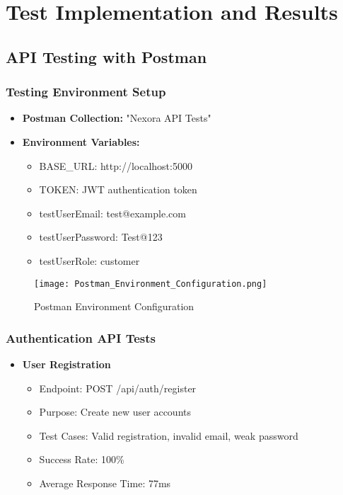 \section{Test Implementation and Results}

\subsection{API Testing with Postman}
\subsubsection{Testing Environment Setup}
\begin{itemize}
    \item \textbf{Postman Collection:} "Nexora API Tests"
    \item \textbf{Environment Variables:}
    \begin{itemize}
        \item BASE\_URL: http://localhost:5000
        \item TOKEN: JWT authentication token
        \item testUserEmail: test@example.com
        \item testUserPassword: Test@123
        \item testUserRole: customer
    \end{itemize}
\end{itemize}

\begin{figure}[h!]
    \centering
    \texttt{[image: Postman\_Environment\_Configuration.png]}
    \caption{Postman Environment Configuration}
    \label{fig:postman_env}
\end{figure}

\subsubsection{Authentication API Tests}
\begin{itemize}
    \item \textbf{User Registration}
    \begin{itemize}
        \item Endpoint: POST /api/auth/register
        \item Purpose: Create new user accounts
        \item Test Cases: Valid registration, invalid email, weak password
        \item Success Rate: 100\%
        \item Average Response Time: 77ms
    \end{itemize}
\end{itemize}

